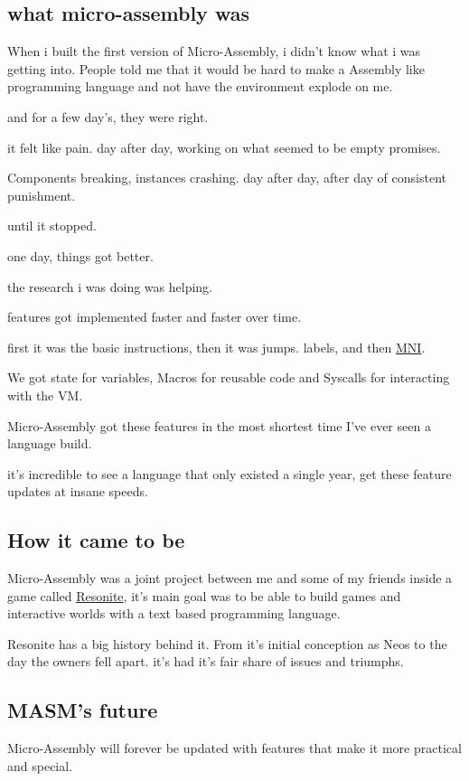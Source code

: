 \documentclass[a4paper,11pt]{book}
\begin{document}
\subsection{what micro-assembly was}
When i built the first version of Micro-Assembly, i didn't know what i was getting into.
People told me that it would be hard to make a Assembly like programming language and not have the environment explode on me.

and for a few day's, they were right.

it felt like pain.
day after day, working on what seemed to be empty promises.

Components breaking, instances crashing.
day after day, after day of consistent punishment.

until it stopped.

one day, things got better.

the research i was doing was helping.

features got implemented faster and faster over time.

first it was the basic instructions, then it was jumps.
labels, and then \hyperref[subpar:MNI]{MNI}.

We got state for variables, Macros for reusable code and Syscalls for interacting with
the VM.

Micro-Assembly got these features in the most shortest time I've ever seen a language build.

it's incredible to see a language that only existed a single year, get these feature updates
at insane speeds.


\subsection{How it came to be}
Micro-Assembly was a joint project between me and some of my friends inside a game called
\hyperref{https://resonite.com}{}{}{Resonite}, it's main goal was to be able to build games and interactive 
worlds with a text based programming language.

Resonite has a big history behind it.
From it's initial conception as Neos to the day the owners fell apart.
it's had it's fair share of issues and triumphs.



\subsection{MASM's future}
Micro-Assembly will forever be updated with features that make it more practical and special.
\end{document}

